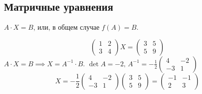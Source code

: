 \documentclass[12pt, a4paper]{article}
\begin{document}
    \subsection{Матричные уравнения}
    \( A \cdot X = B \), или, в общем случае \( f(A) = B \).
    \begin{exmp}
        \[
            \begin{pmatrix} 1 & 2 \\ 3 & 4 \end{pmatrix} X = \begin{pmatrix} 3 & 5 \\ 5 &9 \end{pmatrix} 
        \] 
        \( A \cdot X = B \implies X = A^{-1}\cdot B \). \( \det A = -2, \, A^{-1} = -\frac{1}{2} \begin{pmatrix} 4 & -2 \\ -3 & 1 \end{pmatrix}  \)
        \[
            X = -\frac{1}{2}\begin{pmatrix} 4 & -2 \\ -3 & 1 \end{pmatrix} \begin{pmatrix} 3 & 5 \\ 5 & 9 \end{pmatrix} = \begin{pmatrix} -1 & -1 \\ 2 & 3 \end{pmatrix} 
        \] 
        
    \end{exmp}
\end{document}
